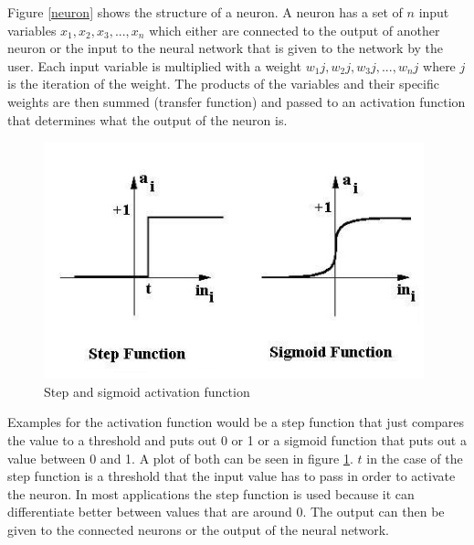 
Figure \ref{neuron} shows the structure of a neuron. A neuron has a set of $n$ input variables $x_1, x_2, x_3, ..., x_n$ which either are connected to the output of another neuron or the input to the neural network that is given to the network by the user. Each input variable is multiplied with a weight $w_1j, w_2j, w_3j, ..., w_nj$ where $j$ is the iteration of the weight. The products of the variables and their specific weights are then summed (transfer function) and passed to an activation function that determines what the output of the neuron is. \cite{introToNNs}

\begin{figure}[ht]
	\centering
  \includegraphics[width=11cm]{figures/activation_functions}
	\caption[Step and sigmoid activation function]{Step and sigmoid activation function \protect\footnotemark}
	\label{activation_functions}
\end{figure}


Examples for the activation function would be a step function that just compares the value to a threshold and puts out 0 or 1 or a sigmoid function that puts out a value between 0 and 1. A plot of both can be seen in figure \ref{activation_functions}. $t$ in the case of the step function is a threshold that the input value has to pass in order to activate the neuron. In most applications the step function is used because it can differentiate better between values that are around 0. The output can then be given to the connected neurons or the output of the neural network. \cite{introToNNs}


